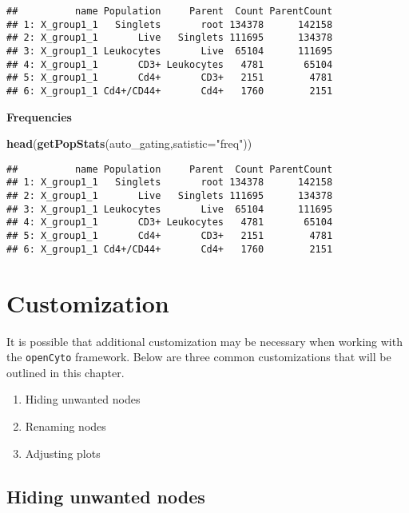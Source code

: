 \documentclass[]{book}
\newenvironment{Shaded}{\begin{snugshade}}{\end{snugshade}}
\newcommand{\DataTypeTok}[1]{\textcolor[rgb]{0.13,0.29,0.53}{#1}}
\newcommand{\KeywordTok}[1]{\textcolor[rgb]{0.13,0.29,0.53}{\textbf{#1}}}
\newcommand{\NormalTok}[1]{#1}
\newcommand{\StringTok}[1]{\textcolor[rgb]{0.31,0.60,0.02}{#1}}
\providecommand{\tightlist}{%
  \setlength{\itemsep}{0pt}\setlength{\parskip}{0pt}}
\begin{document}
\begin{verbatim}
##          name Population     Parent  Count ParentCount
## 1: X_group1_1   Singlets       root 134378      142158
## 2: X_group1_1       Live   Singlets 111695      134378
## 3: X_group1_1 Leukocytes       Live  65104      111695
## 4: X_group1_1       CD3+ Leukocytes   4781       65104
## 5: X_group1_1       Cd4+       CD3+   2151        4781
## 6: X_group1_1 Cd4+/CD44+       Cd4+   1760        2151
\end{verbatim}

\textbf{Frequencies}

\begin{Shaded}
\begin{Highlighting}[]
\KeywordTok{head}\NormalTok{(}\KeywordTok{getPopStats}\NormalTok{(auto_gating,}\DataTypeTok{satistic=}\StringTok{"freq"}\NormalTok{))}
\end{Highlighting}
\end{Shaded}

\begin{verbatim}
##          name Population     Parent  Count ParentCount
## 1: X_group1_1   Singlets       root 134378      142158
## 2: X_group1_1       Live   Singlets 111695      134378
## 3: X_group1_1 Leukocytes       Live  65104      111695
## 4: X_group1_1       CD3+ Leukocytes   4781       65104
## 5: X_group1_1       Cd4+       CD3+   2151        4781
## 6: X_group1_1 Cd4+/CD44+       Cd4+   1760        2151
\end{verbatim}

\hypertarget{customization}{%
\chapter{Customization}\label{customization}}

It is possible that additional customization may be necessary when working with the \texttt{openCyto} framework. Below are three common customizations that will be outlined in this chapter.

\begin{enumerate}
\def\labelenumi{\arabic{enumi}.}
\tightlist
\item
  Hiding unwanted nodes
\item
  Renaming nodes
\item
  Adjusting plots
\end{enumerate}

\hypertarget{hiding-unwanted-nodes}{%
\section{Hiding unwanted nodes}\label{hiding-unwanted-nodes}}
\end{document}
